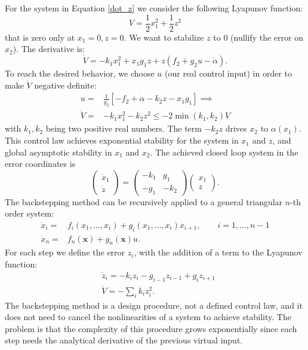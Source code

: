 \documentclass[10pt, a4paper]{report}
\begin{document}
For the system in Equation \eqref{dot_z} we consider the following Lyapunov function: $$V=\frac{1}{2}x_1^2+\frac{1}{2}z^2$$ that is zero only at $x_1=0, z=0$. We want to stabilize $z$ to $0$ (nullify the error on $x_2$). The derivative is:
\begin{equation}
    \dot V=-k_1x_1^2+x_1g_1z+z(f_2+g_2u-\dot\alpha).
\end{equation}
To reach the desired behavior, we choose $u$ (our real control input) in order to make $\dot V$ negative definite:\begin{align}
    u=&\frac{1}{g_2}[-f_2+\dot\alpha-k_2z-x_1g_1]\implies \\
    \dot V = &-k_1x_1^2-k_2z^2\le -2\min(k_1,k_2)V
\end{align}
with $k_1,k_2$ being two positive real numbers. The term $-k_2z$ drives $x_2$ to $\alpha(x_1)$. This control law achieves exponential stability for the system in $x_1$ and $z$, and global asymptotic stability in $x_1$ and $x_2$. The achieved closed loop system in the error coordinates is\begin{equation}
    \begin{pmatrix}
        \dot x_1\\\dot z 
    \end{pmatrix}=\begin{pmatrix}
        -k_1&g_1\\ 
        -g_1&-k_2
    \end{pmatrix}\begin{pmatrix}
        x_1\\z
    \end{pmatrix}.
\end{equation}
The backstepping method can be recursively applied to a general triangular $n$-th order system:\begin{align}
    \dot x_i =& f_i(x_1,\dots, x_i)+g_i(x_1,\dots,x_i)x_{i+1},\quad \quad i=1,\dots,n-1\\ 
    \dot x_n=&f_n(\mathbf x)+g_n(\mathbf x)u.
\end{align}
For each step we define the error $z_i$, with the addition of a term to the Lyapunov function:\begin{align}
    &\dot z_i=-k_iz_i-g_{i-1}z_{i-1}+g_iz_{i+1}\\
    &\dot V =-\sum_ik_iz_i^2.
\end{align}
The backstepping method is a design procedure, not a defined control law, and it does not need to cancel the nonlinearities of a system to achieve stability. The problem is that the complexity of this procedure grows exponentially since each step needs the analytical derivative of the previous virtual input.
\end{document}

